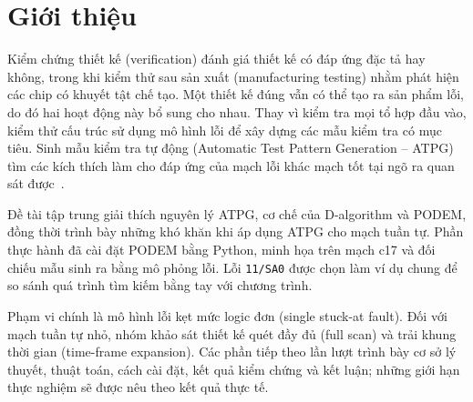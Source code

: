 \chapter{Giới thiệu}
\label{sec:p1-gioi-thieu}
Kiểm chứng thiết kế (verification) đánh giá thiết kế có đáp ứng đặc tả hay không,
trong khi kiểm thử sau sản xuất (manufacturing testing) nhằm phát hiện các chip
có khuyết tật chế tạo. Một thiết kế đúng vẫn có thể tạo ra sản phẩm lỗi, do đó
hai hoạt động này bổ sung cho nhau. Thay vì kiểm tra mọi tổ hợp đầu vào, kiểm
thử cấu trúc sử dụng mô hình lỗi để xây dựng các mẫu kiểm tra có mục tiêu.
Sinh mẫu kiểm tra tự động (Automatic Test Pattern Generation -- ATPG) tìm
các kích thích làm cho đáp ứng của mạch lỗi khác mạch tốt tại ngõ ra
quan sát được~\cite{p1_wang2006}.

Đề tài tập trung giải thích nguyên lý ATPG, cơ chế của D-algorithm và PODEM,
đồng thời trình bày những khó khăn khi áp dụng ATPG cho mạch tuần tự.
Phần thực hành đã cài đặt PODEM bằng Python, minh họa trên mạch c17
và đối chiếu mẫu sinh ra bằng mô phỏng lỗi. Lỗi \texttt{11/SA0} được chọn
làm ví dụ chung để so sánh quá trình tìm kiếm bằng tay với chương trình.

Phạm vi chính là mô hình lỗi kẹt mức logic đơn (single stuck-at fault).
Đối với mạch tuần tự nhỏ, nhóm khảo sát thiết kế quét đầy đủ (full scan)
và trải khung thời gian (time-frame expansion). Các phần tiếp theo lần lượt
trình bày cơ sở lý thuyết, thuật toán, cách cài đặt, kết quả kiểm chứng và
kết luận; những giới hạn thực nghiệm sẽ được nêu theo kết quả thực tế.
